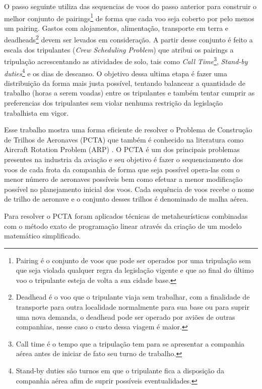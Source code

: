 O passo seguinte utiliza das sequencias de voos do passo anterior para construir
o melhor conjunto de pairings\footnote{Pairing é o conjunto de voos
que pode ser operados por uma tripulação sem que seja violada qualquer
regra da legislação vigente e que ao final do último voo o tripulante
esteja de volta a sua cidade base.} de forma que cada voo seja coberto por
pelo menos um pairing. Gastos com alojamentos, alimentação, transporte em terra
e deadheads\footnote{Deadhead é o voo que o tripulante viaja sem trabalhar,
com a finalidade de transporte para outra localidade normalmente para sua
base ou para suprir uma nova demanda, o deadhead pode ser operado por
aviões de outras companhias, nesse caso o custo dessa viagem é maior.} devem
ser levados em consideração. A partir desse conjunto é feito a escala dos
tripulantes (\textit{Crew Scheduling Problem}) que atribui os pairings a
tripulação acrescentando as atividades de solo, tais como \textit{Call
Time}\footnote{Call time é o tempo que a tripulação tem para se apresentar a
companhia aérea antes de iniciar de fato seu turno de trabalho.},
\textit{Stand-by duties}\footnote{Stand-by duties
são turnos em que o tripulante fica a disposição da companhia aérea afim de
suprir possíveis eventualidades.} e os dias de descanso. O objetivo dessa ultima
etapa é fazer uma distribuição da forma mais justa possível, tentando balancear
a quantidade de trabalho (horas a serem voadas) entre os tripulantes e também
tentar cumprir as preferencias dos tripulantes sem violar nenhuma restrição da
legislação trabalhista em vigor.
   

Esse trabalho mostra uma forma eficiente de resolver o Problema de Construção
de Trilhos de Aeronaves (PCTA) 
que também é conhecido na literatura como Aircraft Rotation
Problem (ARP) 
. O PCTA é um dos
principais problemas presentes na industria da aviação e seu objetivo
é fazer o sequenciamento dos voos de cada frota da companhia de forma que seja
possível opera-las com o menor número de aeronaves possíveis\citep{abiliolivro}
bem como efetuar a menor modificação possível no planejamento inicial dos voos.
Cada sequência de voos recebe o nome de trilho de aeronave e o conjunto desses
trilhos é denominado de malha aérea. 

Para resolver o PCTA foram aplicados técnicas de metaheurísticas combinadas com
o método exato de programação linear através da criação de um modelo matemático
simplificado.

